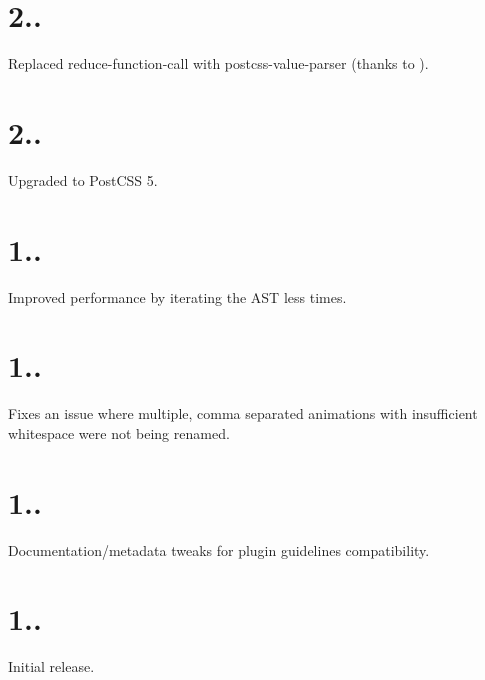 \section*{2..}


\begin{DoxyItemize}
\item Replaced reduce-\/function-\/call with postcss-\/value-\/parser (thanks to ).
\end{DoxyItemize}

\section*{2..}


\begin{DoxyItemize}
\item Upgraded to Post\+C\+SS 5.
\end{DoxyItemize}

\section*{1..}


\begin{DoxyItemize}
\item Improved performance by iterating the A\+ST less times.
\end{DoxyItemize}

\section*{1..}


\begin{DoxyItemize}
\item Fixes an issue where multiple, comma separated animations with insufficient whitespace were not being renamed.
\end{DoxyItemize}

\section*{1..}


\begin{DoxyItemize}
\item Documentation/metadata tweaks for plugin guidelines compatibility.
\end{DoxyItemize}

\section*{1..}


\begin{DoxyItemize}
\item Initial release. 
\end{DoxyItemize}